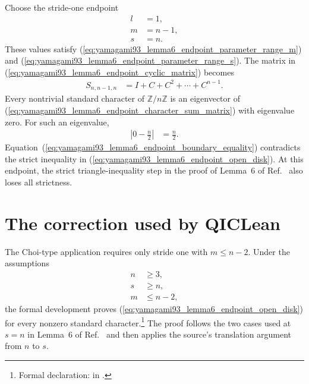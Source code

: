 \documentclass[11pt]{article}
\begin{document}
Choose the stride-one endpoint
\begin{align}
    l
        &= 1,
    \label{eq:yamagami93_lemma6_endpoint_stride_one}\\
    m
        &= n-1,
    \label{eq:yamagami93_lemma6_endpoint_maximal_length}\\
    s
        &= n.
    \label{eq:yamagami93_lemma6_endpoint_minimal_row_sum}
\end{align}
These values satisfy
(\ref{eq:yamagami93_lemma6_endpoint_parameter_range_m}) and
(\ref{eq:yamagami93_lemma6_endpoint_parameter_range_s}). The matrix in
(\ref{eq:yamagami93_lemma6_endpoint_cyclic_matrix}) becomes
\begin{align}
    S_{n,n-1,n}
        &=
        I+C+C^2+\cdots+C^{n-1}.
    \label{eq:yamagami93_lemma6_endpoint_character_sum_matrix}
\end{align}
Every nontrivial standard character of $\mathbb Z/n\mathbb Z$ is an
eigenvector of
(\ref{eq:yamagami93_lemma6_endpoint_character_sum_matrix}) with eigenvalue
zero. For such an eigenvalue,
\begin{align}
    \left|0-\frac{n}{2}\right|
        &= \frac{n}{2}.
    \label{eq:yamagami93_lemma6_endpoint_boundary_equality}
\end{align}
Equation~(\ref{eq:yamagami93_lemma6_endpoint_boundary_equality}) contradicts
the strict inequality in
(\ref{eq:yamagami93_lemma6_endpoint_open_disk}). At this endpoint, the strict
triangle-inequality step in the proof of Lemma~6 of
Ref.~\cite{Yamagami1993Cyclic} also loses all strictness.

\section{The correction used by QICLean}

The Choi-type application requires only stride one with $m\leq n-2$. Under
the assumptions
\begin{align}
    n
        &\geq 3,
    \label{eq:yamagami93_lemma6_endpoint_corrected_n}\\
    s
        &\geq n,
    \label{eq:yamagami93_lemma6_endpoint_corrected_s}\\
    m
        &\leq n-2,
    \label{eq:yamagami93_lemma6_endpoint_corrected_m}
\end{align}
the formal development proves
(\ref{eq:yamagami93_lemma6_endpoint_open_disk}) for every nonzero standard
character.\footnote{Formal declaration:
 in
.}
The proof follows the two cases used at $s=n$ in Lemma~6 of
Ref.~\cite{Yamagami1993Cyclic} and then applies the source's translation
argument from $n$ to $s$.
\end{document}
